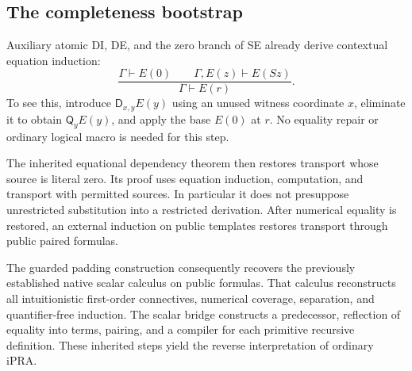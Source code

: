 \documentclass[11pt,letterpaper]{article}
\theoremstyle{definition}
\theoremstyle{remark}
\newcommand{\D}{\mathsf D}
\newcommand{\Q}{\mathsf Q}
\begin{document}
\subsection{The completeness bootstrap}

Auxiliary atomic DI, DE, and the zero branch of SE already derive
contextual equation induction:
\[
 \frac{\Gamma\vdash E(0)\qquad\Gamma,E(z)\vdash E(Sz)}
      {\Gamma\vdash E(r)}.
\]
To see this, introduce $\D_{x,y}E(y)$ using an unused witness coordinate
$x$, eliminate it to obtain $\Q_yE(y)$, and apply the base $E(0)$ at $r$.
No equality repair or ordinary logical macro is needed for this step.

The inherited equational dependency theorem then restores transport
whose source is literal zero. Its proof uses equation induction,
computation, and transport with permitted sources. In particular it does
not presuppose unrestricted substitution into a restricted derivation.
After numerical equality is restored, an external induction on public
templates restores transport through public paired formulas.

The guarded padding construction consequently recovers the previously
established native scalar calculus on public formulas. That calculus
reconstructs all intuitionistic first-order connectives, numerical
coverage, separation, and quantifier-free induction. The scalar bridge
constructs a predecessor, reflection of equality into terms, pairing, and
a compiler for each primitive recursive definition. These inherited
steps yield the reverse interpretation of ordinary iPRA.
\end{document}
